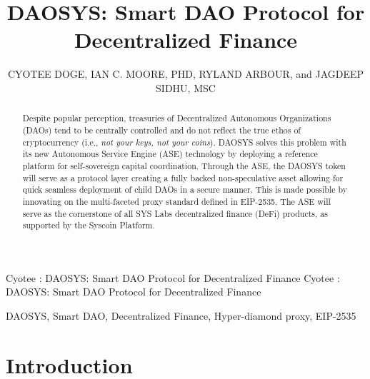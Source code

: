 \documentclass[journal,twocolumn,12pt]{ieeesyscoin}
\begin{document}
\history{}

\title{\centering DAOSYS: Smart DAO Protocol for Decentralized Finance}
\author{\centering  \uppercase{Cyotee Doge}, 
\uppercase{Ian C. Moore, PhD},
\uppercase{Ryland Arbour}, and
\uppercase{Jagdeep Sidhu, MSc}}

\address[1]{\centering DAO Advisor, Syscoin Platform (e-mail: cyotee@syscoin.org)}
\address[2]{\centering  Syscoin Researcher, Syscoin Platform (e-mail: imoore@syscoin.org)}
\address[3]{\centering  L2 Advisor, Syscoin Platform (e-mail: rylandarbour@syscoin.com)}
\address[4]{\centering Syscoin Lead Developer, (e-mail: sidhujag@syscoin.org)}
\tfootnote{}

\markboth
{Cyotee \headeretal: DAOSYS: Smart DAO Protocol for Decentralized Finance}
{Cyotee \headeretal: DAOSYS: Smart DAO Protocol for Decentralized Finance}

\corresp{}

\begin{abstract}
Despite popular perception, treasuries of Decentralized Autonomous Organizations (DAOs) tend to be centrally controlled and do not reflect the true ethos of cryptocurrency (i.e., \textit{not your keys, not your coins}). DAOSYS solves this problem with its new Autonomous Service Engine (ASE) technology by deploying a reference platform for self-sovereign capital coordination. Through the ASE, the DAOSYS token will serve as a protocol layer creating a fully backed non-speculative asset allowing for quick seamless deployment of child DAOs in a secure manner. This is made possible by innovating on the multi-faceted proxy standard defined in EIP-2535. The ASE will serve as the cornerstone of all SYS Labs decentralized finance (DeFi) products, as supported by the Syscoin Platform.
\end{abstract}

\begin{keywords}
DAOSYS, Smart DAO, Decentralized Finance, Hyper-diamond proxy, EIP-2535
\end{keywords}

\titlepgskip=-15pt

\maketitle

\section{Introduction}
\label{sec:introduction}
\end{document}
